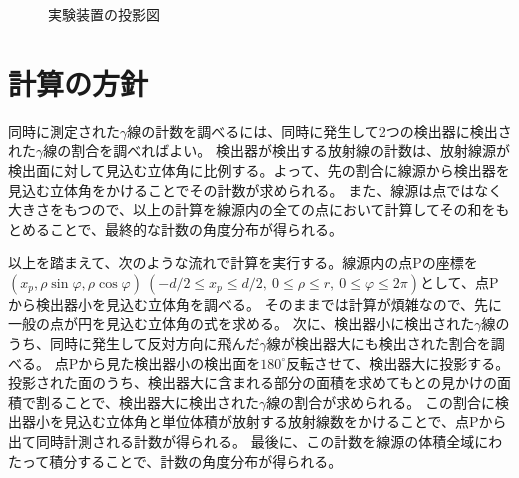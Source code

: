 \documentclass[11pt, titlepage, openany]{ltjsbook}
\begin{document}
\begin{figure}[H]
    \caption{実験装置の投影図}
    \label{system1}
\end{figure}
\section{計算の方針}
\label{plan}
同時に測定された$\gamma$線の計数を調べるには、同時に発生して2つの検出器に検出された$\gamma$線の割合を調べればよい。
検出器が検出する放射線の計数は、放射線源が検出面に対して見込む立体角に比例する。よって、先の割合に線源から検出器を見込む立体角をかけることでその計数が求められる。
また、線源は点ではなく大きさをもつので、以上の計算を線源内の全ての点において計算してその和をもとめることで、最終的な計数の角度分布が得られる。\par
以上を踏まえて、次のような流れで計算を実行する。線源内の点Pの座標を$(x_p, \rho \sin\varphi, \rho \cos\varphi)\ 
(-d/2 \le x_p \le d/2 ,\ 0 \le \rho \le r, \ 0 \le \varphi \le 2\pi)$として、点Pから検出器小を見込む立体角を調べる。
そのままでは計算が煩雑なので、先に一般の点が円を見込む立体角の式を求める。
次に、検出器小に検出された$\gamma$線のうち、同時に発生して反対方向に飛んだ$\gamma$線が検出器大にも検出された割合を調べる。
点Pから見た検出器小の検出面を$180^{\circ}$反転させて、検出器大に投影する。
投影された面のうち、検出器大に含まれる部分の面積を求めてもとの見かけの面積で割ることで、検出器大に検出された$\gamma$線の割合が求められる。
この割合に検出器小を見込む立体角と単位体積が放射する放射線数をかけることで、点Pから出て同時計測される計数が得られる。
最後に、この計数を線源の体積全域にわたって積分することで、計数の角度分布が得られる。
\end{document}
